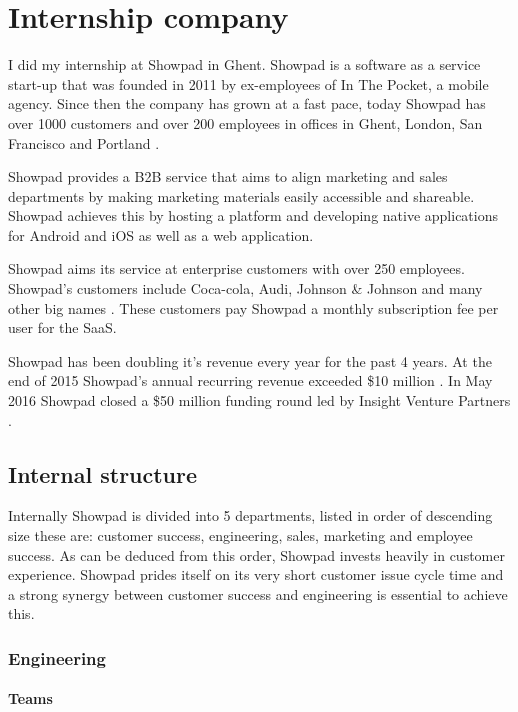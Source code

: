 
\chapter{Internship company} %
\label{sec:voorstelling}

I did my internship at Showpad in Ghent. Showpad is a software as a service start-up that was founded in 2011 by ex-employees of In The Pocket, a mobile agency. Since then the company has grown at a fast pace, today Showpad has over 1000 customers and over 200 employees in offices in Ghent, London, San Francisco and Portland \cite{showpad-grow}.

Showpad provides a B2B service that aims to align marketing and sales departments by making marketing materials easily accessible and shareable. Showpad achieves this by hosting a platform and developing native applications for Android and iOS as well as a web application.

Showpad aims its service at enterprise customers with over 250 employees. Showpad's customers include Coca-cola, Audi, Johnson \& Johnson and many other big names \cite{showpad}. These customers pay Showpad a monthly subscription fee per user for the SaaS.

Showpad has been doubling it's revenue every year for the past 4 years. At the end of 2015 Showpad's annual recurring revenue exceeded \$10 million \cite{showpad-arr}. In May 2016 Showpad closed a \$50 million funding round led by Insight Venture Partners \cite{showpad-grow}.

\section{Internal structure}

Internally Showpad is divided into 5 departments, listed in order of descending size these are: customer success, engineering, sales, marketing and employee success. As can be deduced from this order, Showpad invests heavily in customer experience. Showpad prides itself on its very short customer issue cycle time and a strong synergy between customer success and engineering is essential to achieve this.

\subsection{Engineering}

\subsubsection{Teams}

